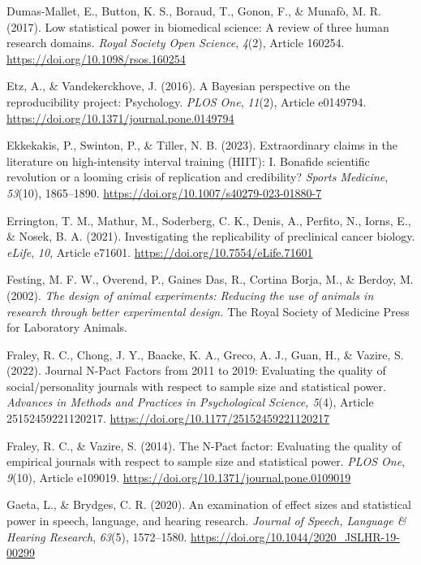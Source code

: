 \documentclass[authordate, meta]{jote-new-article}
\begin{document}
	Dumas-Mallet, E., Button, K. S., Boraud, T., Gonon, F., \& Munafò, M. R. (2017). Low statistical power in biomedical science: A review of three human research domains. \emph{Royal Society Open Science}, \emph{4}(2), Article 160254. \url{https://doi.org/10.1098/rsos.160254}



	Etz, A., \& Vandekerckhove, J. (2016). A Bayesian perspective on the reproducibility project: Psychology. \emph{PLOS One}, \emph{11}(2), Article e0149794. \url{https://doi.org/10.1371/journal.pone.0149794}



	Ekkekakis, P., Swinton, P., \& Tiller, N. B. (2023). Extraordinary claims in the literature on high-intensity interval training (HIIT): I. Bonafide scientific revolution or a looming crisis of replication and credibility? \emph{Sports Medicine}, \emph{53}(10), 1865--1890. \url{https://doi.org/10.1007/s40279-023-01880-7}



	Errington, T. M., Mathur, M., Soderberg, C. K., Denis, A., Perfito, N., Iorns, E., \& Nosek, B. A. (2021). Investigating the replicability of preclinical cancer biology. \emph{eLife}, \emph{10}, Article e71601. \url{https://doi.org/10.7554/eLife.71601}



	Festing, M. F. W., Overend, P., Gaines Das, R., Cortina Borja, M., \& Berdoy, M. (2002). \emph{The design of animal experiments: Reducing the use of animals in research through better experimental design.} The Royal Society of Medicine Press for Laboratory Animals.



	Fraley, R. C., Chong, J. Y., Baacke, K. A., Greco, A. J., Guan, H., \& Vazire, S. (2022). Journal N-Pact Factors from 2011 to 2019: Evaluating the quality of social/personality journals with respect to sample size and statistical power. \emph{Advances in Methods and Practices in Psychological Science, 5}(4), Article 25152459221120217. \url{https://doi.org/10.1177/25152459221120217}



	Fraley, R. C., \& Vazire, S. (2014). The N-Pact factor: Evaluating the quality of empirical journals with respect to sample size and statistical power. \emph{PLOS One}, \emph{9}(10), Article e109019. \url{https://doi.org/10.1371/journal.pone.0109019}



	Gaeta, L., \& Brydges, C. R. (2020). An examination of effect sizes and statistical power in speech, language, and hearing research. \emph{Journal of Speech, Language \& Hearing Research}, \emph{63}(5), 1572--1580. \url{https://doi.org/10.1044/2020\_JSLHR-19-00299}
\end{document}

